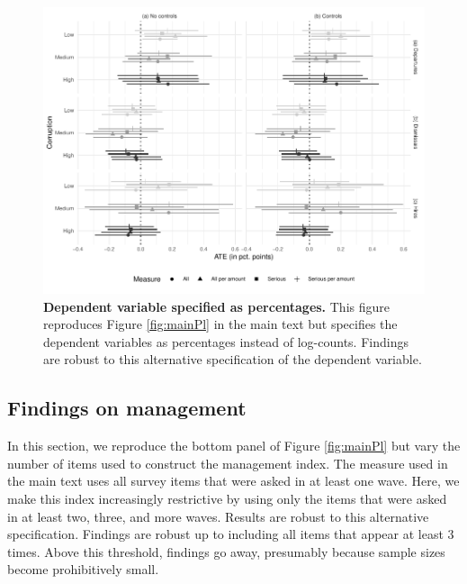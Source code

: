 \documentclass[12pt,a4paper]{article}
\theoremstyle{definition}
\begin{document}
{\begin{figure}[H]
    \centering
    \includegraphics{figures/plDv}
    \caption{{\bf Dependent variable specified as percentages.} This figure reproduces Figure \ref{fig:mainPl} in the main text but specifies the dependent variables as percentages instead of log-counts. Findings are robust to this alternative specification of the dependent variable.}
    \label{fig:plDv}
\end{figure}

\subsection{Findings on management}
\label{app:managementRobustness}

In this section, we reproduce the bottom panel of Figure \ref{fig:mainPl} but vary the number of items used to construct the management index. The measure used in the main text uses all survey items that were asked in at least one wave. Here, we make this index increasingly restrictive by using only the items that were asked in at least two, three, and more waves. Results are robust to this alternative specification. Findings are robust up to including all items that appear at least 3 times. Above this threshold, findings go away, presumably because sample sizes become prohibitively small.

}
\end{document}
